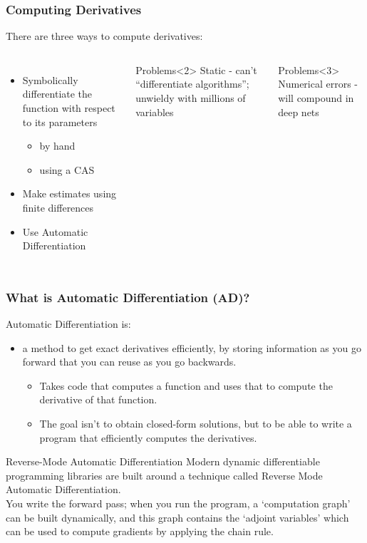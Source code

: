 \documentclass[\beamerclass,aspectratio=1610]{beamer}
\begin{document}
\begin{frame}
	\frametitle{Computing Derivatives}
There are three ways to compute derivatives:

\begin{columns}
    \begin{itemize}
    	\item<1,2> Symbolically differentiate the function with respect to its parameters
    	\begin{itemize}
    		\item by hand
    		\item using a CAS
    	\end{itemize}
    	\item<1,3> Make estimates using finite differences
    	\item<1,4> Use Automatic Differentiation
    \end{itemize}

      \begin{block}{Problems}<2>
        Static - can't ``differentiate algorithms''; unwieldy with millions of variables
      \end{block}
      \begin{block}{Problems}<3>
        Numerical errors - will compound in deep nets
      \end{block}
  \end{columns}
\end{frame}

\begin{frame}
	\frametitle{What is Automatic Differentiation (AD)?}

	Automatic Differentiation is:
	\begin{itemize}
		\item a method to get exact derivatives efficiently, by storing information as you go forward that you can reuse as you go backwards.
		\begin{itemize}
			\item Takes code that computes a function and uses that to compute the derivative of that function.
		\item The goal isn't to obtain closed-form solutions, but to be able to write a program that efficiently computes the derivatives.
		\end{itemize}
	\end{itemize}
	\pause
	\begin{block}{Reverse-Mode Automatic Differentiation}
	Modern dynamic differentiable programming libraries are built around a technique called Reverse Mode Automatic Differentiation. 
	\\[0.5em]
	You write the forward pass; when you run the program, a `computation graph' can be built dynamically, and this graph contains the `adjoint variables' which can be used to compute gradients by applying the chain rule.
	\end{block}
\end{frame}
\end{document}
